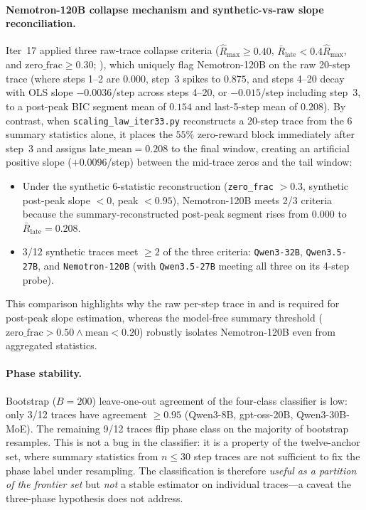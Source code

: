 \paragraph{Nemotron-120B collapse mechanism and synthetic-vs-raw slope reconciliation.}
Iter~17 applied three raw-trace collapse criteria ($\hat R_{\max} \ge 0.40$,
$\bar R_{\text{late}} < 0.4 \hat R_{\max}$, and $\mathrm{zero\_frac} \ge 0.30$;
), which uniquely flag
Nemotron-120B on the raw 20-step trace (where steps 1--2 are $0.000$,
step~3 spikes to $0.875$, and steps 4--20 decay with OLS slope
$-0.0036$/step across steps 4--20, or $-0.015$/step including step~3,
to a post-peak BIC segment mean of $0.154$ and last-5-step mean of
$0.208$). By contrast, when \texttt{scaling\_law\_iter33.py}
reconstructs a 20-step trace from the 6 summary statistics alone, it
places the $55\%$ zero-reward block immediately after step~3 and
assigns $\mathrm{late\_mean} = 0.208$ to the final window, creating an
artificial positive slope ($+0.0096$/step) between the mid-trace zeros
and the tail window:
\begin{itemize}
\item Under the synthetic 6-statistic reconstruction (\texttt{zero\_frac} $> 0.3$,
  synthetic post-peak slope $< 0$, peak $< 0.95$), Nemotron-120B meets
  2/3 criteria because the summary-reconstructed post-peak segment
  rises from $0.000$ to $\bar R_{\text{late}} = 0.208$.
\item 3/12 synthetic traces meet $\ge 2$ of the three criteria:
  \texttt{Qwen3-32B}, \texttt{Qwen3.5-27B}, and \texttt{Nemotron-120B}
  (with \texttt{Qwen3.5-27B} meeting all three on its 4-step probe).
\end{itemize}
This comparison highlights why the raw per-step trace in
 and 
is required for post-peak slope estimation, whereas the model-free
summary threshold ($\mathrm{zero\_frac} > 0.50 \wedge \mathrm{mean} < 0.20$)
robustly isolates Nemotron-120B even from aggregated statistics.

\paragraph{Phase stability.}
Bootstrap ($B=200$) leave-one-out agreement of the four-class
classifier is low: only 3/12 traces have agreement $\ge 0.95$
(Qwen3-8B, gpt-oss-20B, Qwen3-30B-MoE). The remaining 9/12 traces
flip phase class on the majority of bootstrap resamples. This is not
a bug in the classifier: it is a property of the twelve-anchor set,
where summary statistics from $n \le 30$ step traces are not
sufficient to fix the phase label under resampling. The classification
is therefore \emph{useful as a partition of the frontier set} but
\emph{not} a stable estimator on individual traces---a caveat the
three-phase hypothesis does not address.

